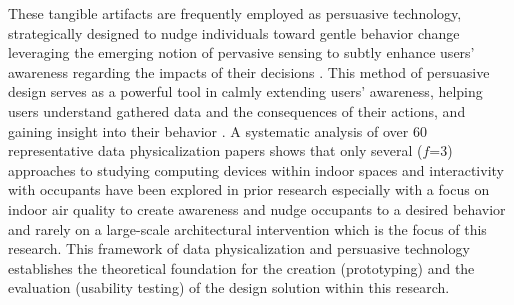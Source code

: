 These tangible artifacts are frequently employed as persuasive technology, strategically designed to nudge individuals toward gentle behavior change leveraging the emerging notion of pervasive sensing to subtly enhance users' awareness regarding the impacts of their decisions \cite{bader_windowwall_2019, rogers_ambient_2010}. This method of persuasive design serves as a powerful tool in calmly extending users' awareness, helping users understand gathered data and the consequences of their actions, and gaining insight into their behavior \cite{bae_making_2022}. A systematic analysis of over 60 representative data physicalization papers \cite{sauve_physecology_2022} shows that only several ($f$=3) approaches to studying computing devices within indoor spaces and interactivity with occupants have been explored in prior research especially with a focus on indoor air quality to create awareness and nudge occupants to a desired behavior and rarely on a large-scale architectural intervention which is the focus of this research. This framework of data physicalization and persuasive technology establishes the theoretical foundation for the creation (prototyping) and the evaluation (usability testing) of the design solution within this research.